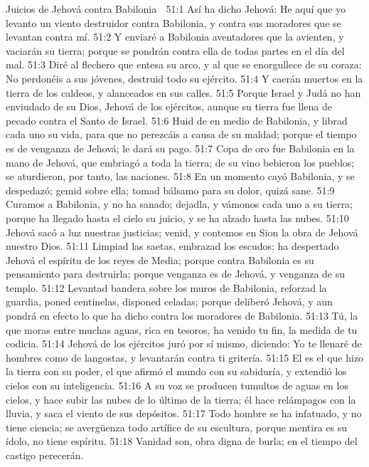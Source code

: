 Juicios de Jehová contra Babilonia  

51:1 Así ha dicho Jehová: He aquí que yo levanto un viento destruidor contra Babilonia, y contra sus moradores que se levantan contra mí.  
51:2 Y enviaré a Babilonia aventadores que la avienten, y vaciarán su tierra; porque se pondrán contra ella de todas partes en el día del mal.  
51:3 Diré al flechero que entesa su arco, y al que se enorgullece de su coraza: No perdonéis a sus jóvenes, destruid todo su ejército.  
51:4 Y caerán muertos en la tierra de los caldeos, y alanceados en sus calles.  
51:5 Porque Israel y Judá no han enviudado de su Dios, Jehová de los ejércitos, aunque su tierra fue llena de pecado contra el Santo de Israel.  
51:6 Huid de en medio de Babilonia, y librad cada uno su vida, para que no perezcáis a causa de su maldad; porque el tiempo es de venganza de Jehová; le dará su pago.  
51:7 Copa de oro fue Babilonia en la mano de Jehová, que embriagó a toda la tierra; de su vino bebieron los pueblos; se aturdieron, por tanto, las naciones.  
51:8 En un momento cayó Babilonia, y se despedazó; gemid sobre ella; tomad bálsamo para su dolor, quizá sane.  
51:9 Curamos a Babilonia, y no ha sanado; dejadla, y vámonos cada uno a su tierra; porque ha llegado hasta el cielo su juicio, y se ha alzado hasta las nubes.  
51:10 Jehová sacó a luz nuestras justicias; venid, y contemos en Sion la obra de Jehová nuestro Dios.  
51:11 Limpiad las saetas, embrazad los escudos; ha despertado Jehová el espíritu de los reyes de Media; porque contra Babilonia es su pensamiento para destruirla; porque venganza es de Jehová, y venganza de su templo.  
51:12 Levantad bandera sobre los muros de Babilonia, reforzad la guardia, poned centinelas, disponed celadas; porque deliberó Jehová, y aun pondrá en efecto lo que ha dicho contra los moradores de Babilonia.  
51:13 Tú, la que moras entre muchas aguas,  rica en tesoros, ha venido tu fin, la medida de tu codicia.  
51:14 Jehová de los ejércitos juró por sí mismo, diciendo: Yo te llenaré de hombres como de langostas, y levantarán contra ti gritería.  
51:15 El es el que hizo la tierra con su poder, el que afirmó el mundo con su sabiduría, y extendió los cielos con su inteligencia.  
51:16 A su voz se producen tumultos de aguas en los cielos, y hace subir las nubes de lo último de la tierra; él hace relámpagos con la lluvia, y saca el viento de sus depósitos.  
51:17 Todo hombre se ha infatuado, y no tiene ciencia; se avergüenza todo artífice de su escultura, porque mentira es su ídolo, no tiene espíritu.  
51:18 Vanidad son, obra digna de burla; en el tiempo del castigo perecerán.  
